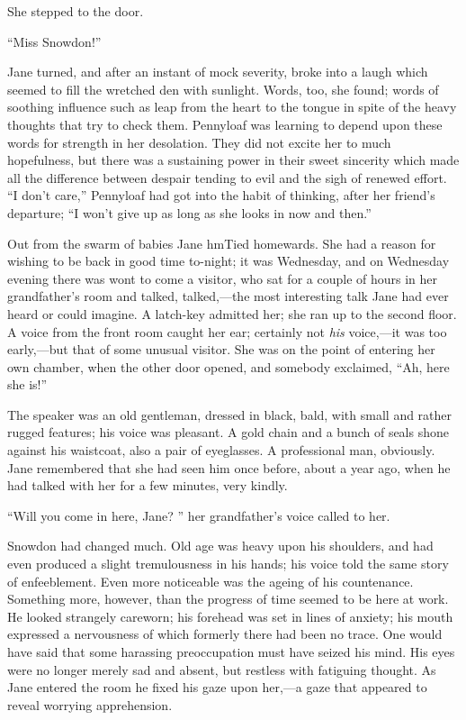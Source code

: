 She stepped to the door.

``Miss Snowdon!''

Jane turned, and after an instant of mock severity, broke into a laugh
which seemed to fill the wretched den with sunlight. Words, too, she
found; words of soothing influence such as leap from the heart to the
tongue in spite of the heavy thoughts that try to check them. Pennyloaf
was learning to depend upon these words for strength in her desolation.
They did not excite her to much hopefulness, but there was a sustaining
power in their sweet sincerity which made all the difference between
despair tending to evil and the sigh of renewed effort. ``I don't
care,'' Pennyloaf had got into the habit of thinking,
{\protect\hypertarget{32}{}{}}after her friend's departure; ``I won't
give up as long as she looks in now and then.''

Out from the swarm of babies Jane hmTied homewards. She had a reason for
wishing to be back in good time to-night; it was Wednesday, and on
Wednesday evening there was wont to come a visitor, who sat for a couple
of hours in her grandfather's room and talked, talked,---the most
interesting talk Jane had ever heard or could imagine. A latch-key
admitted her; she ran up to the second floor. A voice from the front
room caught her ear; certainly not \emph{his} voice,---it was too
early,---but that of some unusual visitor. She was on the point of
entering her own chamber, when the other door opened, and somebody
exclaimed, ``Ah, here she is!''

The speaker was an old gentleman, dressed in black, bald, with small and
rather rugged features; his voice was pleasant. A gold chain and a bunch
of seals shone against his waistcoat, also a pair of eyeglasses. A
professional man, obviously. Jane remembered
{\protect\hypertarget{33}{}{}}that she had seen him once before, about a
year ago, when he had talked with her for a few minutes, very kindly.

``Will you come in here, Jane? '' her grandfather's voice called to her.

Snowdon had changed much. Old age was heavy upon his shoulders, and had
even produced a slight tremulousness in his hands; his voice told the
same story of enfeeblement. Even more noticeable was the ageing of his
countenance. Something more, however, than the progress of time seemed
to be here at work. He looked strangely careworn; his forehead was set
in lines of anxiety; his mouth expressed a nervousness of which formerly
there had been no trace. One would have said that some harassing
preoccupation must have seized his mind. His eyes were no longer merely
sad and absent, but restless with fatiguing thought. As Jane entered the
room he fixed his gaze upon her,---a gaze that appeared to reveal
worrying apprehension.

